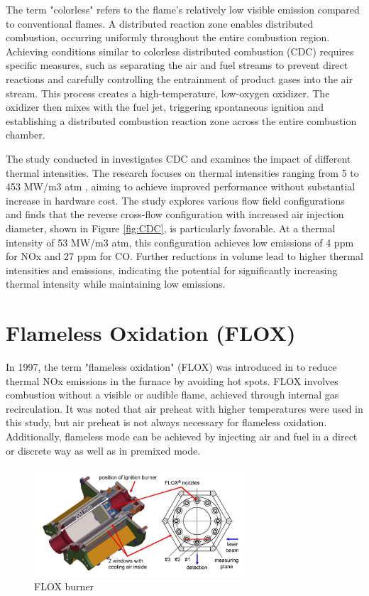  The term "colorless" refers to the flame's relatively low visible emission compared to conventional flames\cite{ARGHODE201129}. A distributed reaction zone enables distributed combustion, occurring uniformly throughout the entire combustion region. Achieving conditions similar to colorless distributed combustion (CDC) requires specific measures, such as separating the air and fuel streams to prevent direct reactions and carefully controlling the entrainment of product gases into the air stream\cite{10.1115/GTINDIA2017-4600}. This process creates a high-temperature, low-oxygen oxidizer\cite{ARGHODE201129}. The oxidizer then mixes with the fuel jet, triggering spontaneous ignition and establishing a distributed combustion reaction zone across the entire combustion chamber\cite{ARGHODE201129}.

The study conducted in \cite{ARGHODE2013930} investigates CDC and examines the impact of different thermal intensities. The research focuses on thermal intensities ranging from 5 to 453 MW/m3 atm \cite{VAThesis2011}, aiming to achieve improved performance without substantial increase in hardware cost. The study explores various flow field configurations and finds that the reverse cross-flow configuration with increased air injection diameter, shown in Figure \ref{fig:CDC}, is particularly favorable. At a thermal intensity of 53 MW/m3 atm, this configuration achieves low emissions of 4 ppm for NOx and 27 ppm for CO\cite{VAThesis2011}. Further reductions in volume lead to higher thermal intensities and emissions, indicating the potential for significantly increasing thermal intensity while maintaining low emissions.
 
\section{Flameless Oxidation (FLOX)}
In 1997, the term "flameless oxidation" (FLOX) was introduced in \cite{WUNNING199781} to reduce thermal NOx emissions in the furnace by avoiding hot spots. FLOX involves combustion without a visible or audible flame, achieved through internal gas recirculation. It was noted that air preheat with higher temperatures were used in this study, but air preheat is not always necessary for flameless oxidation. Additionally, flameless mode can be achieved by injecting air and fuel in a direct or discrete way as well as in premixed mode.

\begin{figure}[!h]
    \centering    
    \includegraphics[width=0.7\textwidth]{Chapter2/Images/FLOX.jpeg}
    \caption[FLOX burner]{FLOX burner \cite{LAMMEL4001825}}
    \label{fig:FLOX}
\end{figure}

